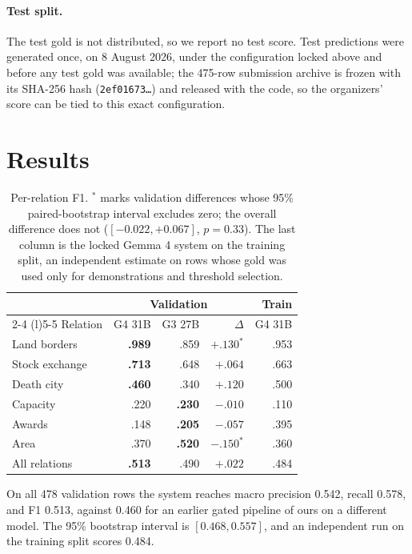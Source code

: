 \documentclass[11pt]{article}
\begin{document}
\paragraph{Test split.}
The test gold is not distributed, so we report no test score. Test predictions
were generated once, on 8 August 2026, under the configuration locked above
and before any test gold was available; the 475-row submission archive is
frozen with its SHA-256 hash (\texttt{2ef01673\ldots}) and released with the
code, so the organizers' score can be tied to this exact configuration.

\section{Results}
\label{sec:results}

\begin{table}[t]
  \centering
  \small
  \begin{tabular}{@{}lrrrr@{}}
    \toprule
    & \multicolumn{3}{c}{Validation} & Train \\
    \cmidrule(lr){2-4} \cmidrule(l){5-5}
    Relation & G4 31B & G3 27B & $\Delta$ & G4 31B \\
    \midrule
    Land borders & \textbf{.989} & .859 & $+.130^{*}$ & .953 \\
    Stock exchange & \textbf{.713} & .648 & $+.064$ & .663 \\
    Death city & \textbf{.460} & .340 & $+.120$ & .500 \\
    Capacity & .220 & \textbf{.230} & $-.010$ & .110 \\
    Awards & .148 & \textbf{.205} & $-.057$ & .395 \\
    Area & .370 & \textbf{.520} & $-.150^{*}$ & .360 \\
    \midrule
    All relations & \textbf{.513} & .490 & $+.022$ & .484 \\
    \bottomrule
  \end{tabular}
  \caption{Per-relation F1. $^{*}$ marks validation differences whose 95\%
  paired-bootstrap interval excludes zero; the overall difference does not
  ($[-0.022, +0.067]$, $p=0.33$). The last column is the locked Gemma 4 system
  on the training split, an independent estimate on rows whose gold was used
  only for demonstrations and threshold selection.}
  \label{tab:per-relation}
\end{table}

On all 478 validation rows the system reaches macro precision 0.542, recall
0.578, and F1 0.513, against 0.460 for an earlier gated pipeline of ours on a
different model. The 95\% bootstrap interval is $[0.468, 0.557]$, and an
independent run on the training split scores 0.484.
\end{document}
